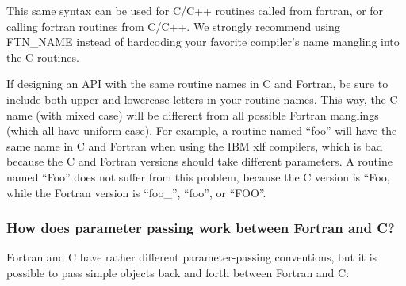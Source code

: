 This same syntax can be used for C/C++ routines called from
fortran, or for calling fortran routines from C/C++.
We strongly recommend using FTN\_NAME instead of hardcoding your
favorite compiler's name mangling into the C routines.

If designing an API with the same routine names in C and 
Fortran, be sure to include both upper and lowercase letters
in your routine names.  This way, the C name (with mixed case)
will be different from all possible Fortran manglings (which
all have uniform case).  For example, a routine named ``foo''
will have the same name in C and Fortran when using the IBM
xlf compilers, which is bad because the C and Fortran versions
should take different parameters.  A routine named ``Foo'' does
not suffer from this problem, because the C version is ``Foo,
while the Fortran version is ``foo\_'', ``foo'', or ``FOO''.

\subsubsection{How does parameter passing work between Fortran and C?}

Fortran and C have rather different parameter-passing 
conventions, but it is possible to pass simple objects 
back and forth between Fortran and C:

